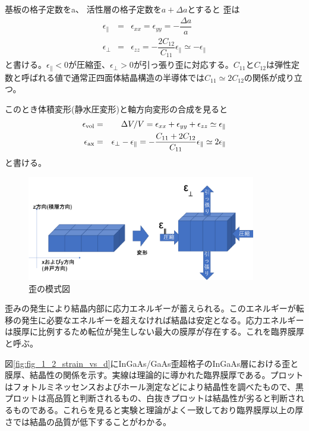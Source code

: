 基板の格子定数をa、 活性層の格子定数を$a+\Delta a$とすると
歪は
\begin{eqnarray}
\epsilon_{\|}&=&\epsilon_{xx}=\epsilon_{yy}=-\dfrac{\Delta a}{a}\\
\epsilon_{\bot}&=&\epsilon_{zz}=-\dfrac{2C_{12}}{C_{11}}\epsilon_{\|}\simeq -\epsilon_{\|}
\end{eqnarray}
と書ける。$\epsilon_{\|}<0$が圧縮歪、$\epsilon_{\bot}>0$が引っ張り歪に対応する。$C_{11}$と$C_{12}$は弾性定数と呼ばれる値で通常正四面体結晶構造の半導体では$C_{11}\simeq 2C_{12}$の関係が成り立つ\cite{ref_iga}。


このとき体積変形(静水圧変形)と軸方向変形の合成を見ると
\begin{eqnarray}
\epsilon_{\rm{vol}}&=&\Delta V/V=\epsilon _{xx}+\epsilon _{yy}+\epsilon_{zz}\simeq \epsilon_{\|}\\
\epsilon_{\rm{ax}}&=&\epsilon_{\bot}-\epsilon_{\|}=-\dfrac{C_{11}+2C_{12}}{C_{11}}\epsilon_{\|}\simeq 2\epsilon_{\|}
\end{eqnarray}
と書ける。
\begin{figure}[h]
	\centering
	\includegraphics[width=10cm]{figure/fig_1_1_lattice_strain02.png}
	\caption{歪の模式図}
	\label{fig:fig_lattice_strain02}
\end{figure}
歪みの発生により結晶内部に応力エネルギーが蓄えられる。このエネルギーが転移の発生に必要なエネルギーを超えなければ結晶は安定となる。応力エネルギーは膜厚に比例するため転位が発生しない最大の膜厚が存在する。これを臨界膜厚と呼ぶ。

図\ref{fig:fig_1_2_strain_vs_d}にInGaAs/GaAs歪超格子のInGaAs層における歪と膜厚、結晶性の関係を示す\cite{ref_konagai}。実線は理論的に導かれた臨界膜厚である。プロットはフォトルミネッセンスおよびホール測定などにより結晶性を調べたもので、黒プロットは高品質と判断されるもの、白抜きプロットは結晶性が劣ると判断されるものである。これらを見ると実験と理論がよく一致しており臨界膜厚以上の厚さでは結晶の品質が低下することがわかる。

